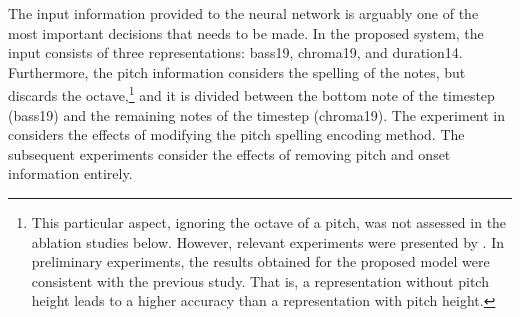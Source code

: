 
The input information provided to the neural network is
arguably one of the most important decisions that needs to
be made. In the proposed system, the input consists of three
representations: \gls{bass19}, \gls{chroma19}, and
\gls{duration14}. Furthermore, the pitch information
considers the spelling of the notes, but discards the
octave,\footnote{This particular aspect, ignoring the octave
of a pitch, was not assessed in the ablation studies below.
However, relevant experiments were presented by
\textcite{micchi2020not}. In preliminary experiments, the
results obtained for the proposed model were consistent with
the previous study. That is, a representation without pitch
height leads to a higher accuracy than a representation with
pitch height.} and it is divided between the bottom note of
the timestep (\gls{bass19}) and the remaining notes of the
timestep (\gls{chroma19}). The experiment in
 considers
the effects of modifying the pitch spelling encoding method.
The subsequent experiments consider the effects of removing
pitch and onset information entirely.

